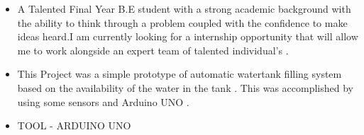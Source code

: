 \documentclass[10pt,a4paper,ragged2e]{altacv}
\begin{document}

\begin{fullwidth}
\makecvheader
\end{fullwidth}


\begin{itemize}
\item A Talented Final Year B.E student with a strong academic background with the ability to think through a problem coupled with the confidence to make ideas heard.I am currently looking for a internship opportunity that will allow me to work alongside an expert team of talented individual's .
\end{itemize}


\begin{itemize}
\item This Project was a simple prototype of automatic watertank filling system based on the availability of the water in the tank . This was accomplished by using some sensors and Arduino UNO . 
\item TOOL - ARDUINO UNO
\end{itemize}
\end{document}
